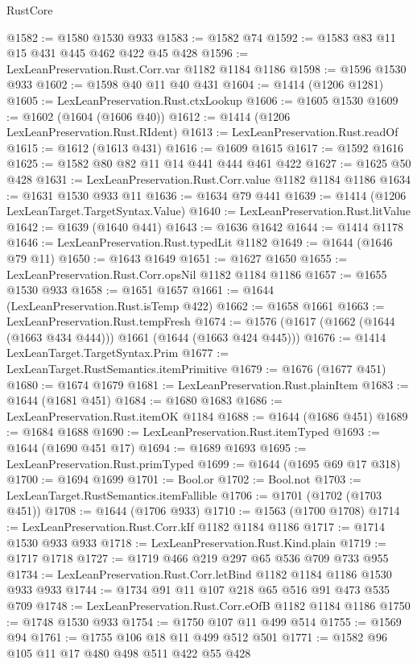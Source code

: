 \begin{lexlean}{RustCore}
\begin{coremodule}
@1582 := @1580 @1530 @933
@1583 := @1582 @74
@1592 := @1583 @83 @11 @15 @431 @445 @462 @422 @45 @428
@1596 := LexLeanPreservation.Rust.Corr.var @1182 @1184 @1186
@1598 := @1596 @1530 @933
@1602 := @1598 @40 @11 @40 @431
@1604 := @1414 (@1206 @1281)
@1605 := LexLeanPreservation.Rust.ctxLookup
@1606 := @1605 @1530
@1609 := @1602 (@1604 (@1606 @40))
@1612 := @1414 (@1206 LexLeanPreservation.Rust.RIdent)
@1613 := LexLeanPreservation.Rust.readOf
@1615 := @1612 (@1613 @431)
@1616 := @1609 @1615
@1617 := @1592 @1616
@1625 := @1582 @80 @82 @11 @14 @441 @444 @461 @422
@1627 := @1625 @50 @428
@1631 := LexLeanPreservation.Rust.Corr.value @1182 @1184 @1186
@1634 := @1631 @1530 @933 @11
@1636 := @1634 @79 @441
@1639 := @1414 (@1206 LexLeanTarget.TargetSyntax.Value)
@1640 := LexLeanPreservation.Rust.litValue
@1642 := @1639 (@1640 @441)
@1643 := @1636 @1642
@1644 := @1414 @1178
@1646 := LexLeanPreservation.Rust.typedLit @1182
@1649 := @1644 (@1646 @79 @11)
@1650 := @1643 @1649
@1651 := @1627 @1650
@1655 := LexLeanPreservation.Rust.Corr.opsNil @1182 @1184 @1186
@1657 := @1655 @1530 @933
@1658 := @1651 @1657
@1661 := @1644 (LexLeanPreservation.Rust.isTemp @422)
@1662 := @1658 @1661
@1663 := LexLeanPreservation.Rust.tempFresh
@1674 := @1576 (@1617 (@1662 (@1644 (@1663 @434 @444))) @1661 (@1644 (@1663 @424 @445)))
@1676 := @1414 LexLeanTarget.TargetSyntax.Prim
@1677 := LexLeanTarget.RustSemantics.itemPrimitive
@1679 := @1676 (@1677 @451)
@1680 := @1674 @1679
@1681 := LexLeanPreservation.Rust.plainItem
@1683 := @1644 (@1681 @451)
@1684 := @1680 @1683
@1686 := LexLeanPreservation.Rust.itemOK @1184
@1688 := @1644 (@1686 @451)
@1689 := @1684 @1688
@1690 := LexLeanPreservation.Rust.itemTyped
@1693 := @1644 (@1690 @451 @17)
@1694 := @1689 @1693
@1695 := LexLeanPreservation.Rust.primTyped
@1699 := @1644 (@1695 @69 @17 @318)
@1700 := @1694 @1699
@1701 := Bool.or
@1702 := Bool.not
@1703 := LexLeanTarget.RustSemantics.itemFallible
@1706 := @1701 (@1702 (@1703 @451))
@1708 := @1644 (@1706 @933)
@1710 := @1563 (@1700 @1708)
@1714 := LexLeanPreservation.Rust.Corr.kIf @1182 @1184 @1186
@1717 := @1714 @1530 @933 @933
@1718 := LexLeanPreservation.Rust.Kind.plain
@1719 := @1717 @1718
@1727 := @1719 @466 @219 @297 @65 @536 @709 @733 @955
@1734 := LexLeanPreservation.Rust.Corr.letBind @1182 @1184 @1186 @1530 @933 @933
@1744 := @1734 @91 @11 @107 @218 @65 @516 @91 @473 @535 @709
@1748 := LexLeanPreservation.Rust.Corr.eOfB @1182 @1184 @1186
@1750 := @1748 @1530 @933
@1754 := @1750 @107 @11 @499 @514
@1755 := @1569 @94
@1761 := @1755 @106 @18 @11 @499 @512 @501
@1771 := @1582 @96 @105 @11 @17 @480 @498 @511 @422 @55 @428

\end{coremodule}
\end{lexlean}
